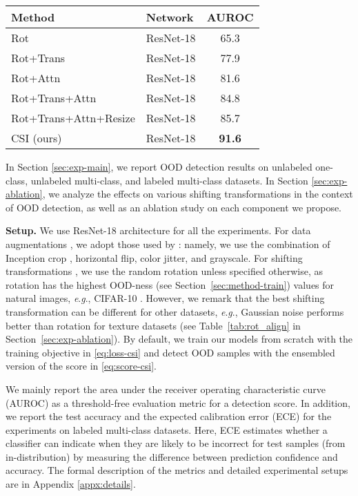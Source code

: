 \documentclass{article}
\newcommand{\eg}{\textit{e}.\textit{g}.}
\begin{document}
\begin{table}[t]
\begin{subtable}{0.55\textwidth}
\begin{tabular}{llc}
\toprule
Method & Network &  AUROC \\
\midrule
Rot \citep{hendrycks2019using_self} & ResNet-18 & 65.3 \\
Rot+Trans \citep{hendrycks2019using_self} & ResNet-18 & 77.9 \\
Rot+Attn \citep{hendrycks2019using_self} & ResNet-18 & 81.6 \\
Rot+Trans+Attn \citep{hendrycks2019using_self} & ResNet-18 & 84.8 \\
Rot+Trans+Attn+Resize \citep{hendrycks2019using_self} & ResNet-18 & 85.7 \\
CSI (ours) & ResNet-18 & \textbf{91.6} \\
\bottomrule
\end{tabular}
\end{subtable}
\end{table}

 
In Section \ref{sec:exp-main}, we report OOD detection results on unlabeled one-class, unlabeled multi-class, and labeled multi-class datasets. In Section \ref{sec:exp-ablation}, we analyze the effects on various shifting transformations in the context of OOD detection, as well as an ablation study on each component we propose.

\textbf{Setup.}
We use ResNet-18 \citep{he2016deep} architecture for all the experiments. For data augmentations , we adopt those used by \citet{chen2020simple}: namely, we use the combination of Inception crop \citep{szegedy2015going}, horizontal flip, color jitter, and grayscale. For shifting transformations , we use the random rotation  unless specified otherwise, as rotation has the highest OOD-ness (see Section~\ref{sec:method-train}) values for natural images, \eg, CIFAR-10 \citep{krizhevsky2009learning}.
However, we remark that the best shifting transformation can be different for other datasets, \eg, Gaussian noise performs better than rotation for texture datasets (see Table~\ref{tab:rot_align} in Section~\ref{sec:exp-ablation}). By default, we train our models from scratch with the training objective in \eqref{eq:loss-csi} and detect OOD samples with the ensembled version of the score in \eqref{eq:score-csi}.


We mainly report the area under the receiver operating characteristic curve (AUROC) as a threshold-free evaluation metric for a detection score. In addition, we report the test accuracy and the expected calibration error (ECE) \citep{naeini2015obtaining, guo2017calibration} for the experiments on labeled multi-class datasets. Here, ECE estimates whether a classifier can indicate when they are likely to be incorrect for test samples (from in-distribution) by measuring the difference between prediction confidence and accuracy. The formal description of the metrics and detailed experimental setups are in Appendix \ref{appx:details}.
\end{document}
